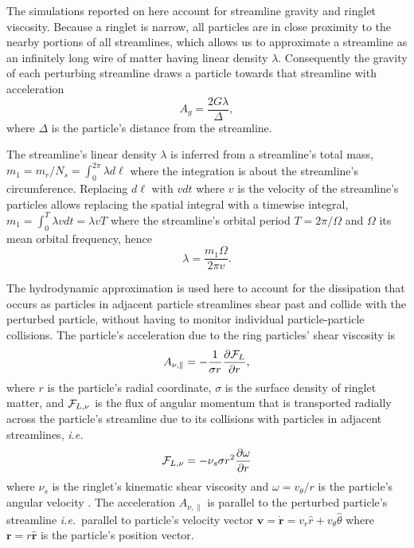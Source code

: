 \documentclass[preprint]{aastex62}
\begin{document}
The simulations reported on here account for streamline gravity
and ringlet viscosity. Because a ringlet is narrow, all particles
are in close proximity to the nearby portions of all streamlines,
which allows us to approximate a streamline as an infinitely
long wire of matter having linear density $\lambda$.
Consequently the gravity of each perturbing streamline draws a particle
towards that streamline with acceleration
\begin{equation}
\label{eqn:gravity}
    A_g=\frac{2G\lambda}{\Delta },
\end{equation}
where $\Delta$ is the particle's distance from the streamline.

The streamline's linear density $\lambda$ is inferred from a streamline's total
mass, $m_1=m_r/N_s=\int_0^{2\pi}\lambda d\ell$
where the integration is about the streamline's circumference. Replacing
$d\ell$ with $vdt$ where $v$ is the velocity of the streamline's particles
allows replacing the spatial integral with a timewise integral,
$m_1=\int_0^{T}\lambda vdt = \lambda v T$ where the streamline's
orbital period $T=2\pi/\Omega$ and $\Omega$ its mean orbital frequency, hence
\begin{equation}
\label{eqn:lambda}
    \lambda=\frac{m_1\Omega}{2\pi v}.
\end{equation}

The hydrodynamic approximation is used here to account for
the dissipation that occurs as particles in adjacent particle streamlines
shear past and collide with the perturbed particle,
without having to monitor individual particle-particle collisions.
The particle's acceleration due to the ring particles' shear viscosity is
\begin{equation}
\label{eqn:shear_viscosity}
    A_{\nu,\parallel}=-\frac{1}{\sigma r}\frac{\partial {\cal F}_L}{\partial r},
\end{equation}
where $r$ is the particle's radial coordinate, 
$\sigma$ is the surface density of ringlet matter, and 
${\cal F}_{L,\nu}$ is the flux of angular momentum
that is transported radially across the particle's streamline
due to its collisions with particles in adjacent streamlines, {\it i.e.}\
\begin{equation}
    \label{eqn:F_nu_theta}
    {\cal F}_{L,\nu} = -\nu_s \sigma r^2\frac{\partial\omega}{\partial r}
\end{equation}
where $\nu_s$ is the ringlet's kinematic shear viscosity
and $\omega=v_\theta/r$ is the particle's angular velocity \citep{HS13}.
The acceleration $A_{\nu,\parallel }$ is parallel to the perturbed particle's streamline
{\it i.e.}\ parallel to particle's velocity vector
$\mathbf{v}=\dot{\mathbf{r}}=v_r\hat{r} + v_\theta\hat{\theta}$ 
where $\mathbf{r} = r\hat{\mathbf{r}}$ is the particle's position vector.
\end{document}
